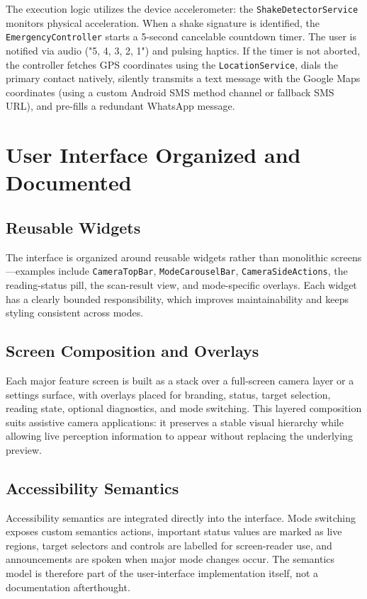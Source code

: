 \documentclass[12pt,a4paper]{report}
\begin{document}
The execution logic utilizes the device accelerometer: the \texttt{ShakeDetectorService} monitors physical acceleration. When a shake signature is identified, the \texttt{EmergencyController} starts a 5-second cancelable countdown timer. The user is notified via audio ("5, 4, 3, 2, 1") and pulsing haptics. If the timer is not aborted, the controller fetches GPS coordinates using the \texttt{LocationService}, dials the primary contact natively, silently transmits a text message with the Google Maps coordinates (using a custom Android SMS method channel or fallback SMS URL), and pre-fills a redundant WhatsApp message.

\section{User Interface Organized and Documented}
\subsection{Reusable Widgets}
The interface is organized around reusable widgets rather than monolithic screens---examples include \texttt{CameraTopBar}, \texttt{ModeCarouselBar}, \texttt{CameraSideActions}, the reading-status pill, the scan-result view, and mode-specific overlays. Each widget has a clearly bounded responsibility, which improves maintainability and keeps styling consistent across modes.

\subsection{Screen Composition and Overlays}
Each major feature screen is built as a stack over a full-screen camera layer or a settings surface, with overlays placed for branding, status, target selection, reading state, optional diagnostics, and mode switching. This layered composition suits assistive camera applications: it preserves a stable visual hierarchy while allowing live perception information to appear without replacing the underlying preview.

\subsection{Accessibility Semantics}
Accessibility semantics are integrated directly into the interface. Mode switching exposes custom semantics actions, important status values are marked as live regions, target selectors and controls are labelled for screen-reader use, and announcements are spoken when major mode changes occur. The semantics model is therefore part of the user-interface implementation itself, not a documentation afterthought.
\end{document}
